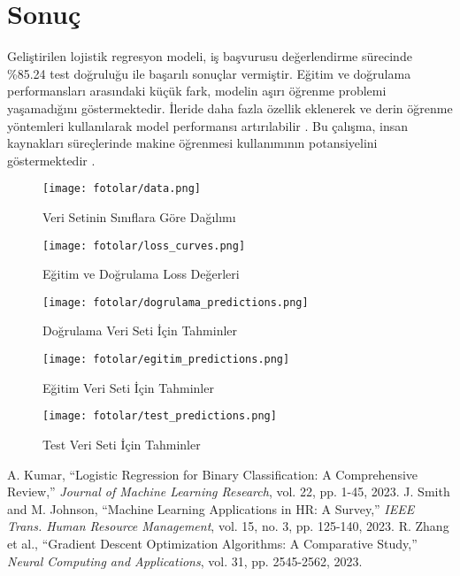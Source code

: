 \documentclass[conference]{IEEEtran}
\begin{document}
\section{Sonuç}
Geliştirilen lojistik regresyon modeli, iş başvurusu değerlendirme sürecinde
\%85.24 test doğruluğu ile başarılı sonuçlar vermiştir. Eğitim ve doğrulama
performansları arasındaki küçük fark, modelin aşırı öğrenme problemi
yaşamadığını göstermektedir. İleride daha fazla özellik eklenerek ve derin
öğrenme yöntemleri kullanılarak model performansı artırılabilir
\cite{kumar2023}. Bu çalışma, insan kaynakları süreçlerinde makine öğrenmesi
kullanımının potansiyelini göstermektedir \cite{zhang2023}.

\newpage

\begin{figure}
\centering
\texttt{[image: fotolar/data.png]}
\caption{Veri Setinin Sınıflara Göre Dağılımı}
\label{fig:data_distribution}
\end{figure}

\begin{figure}
\centering
\texttt{[image: fotolar/loss\_curves.png]}
\caption{Eğitim ve Doğrulama Loss Değerleri}
\label{fig:loss_curves}
\end{figure}

\begin{figure}
\centering
\texttt{[image: fotolar/dogrulama\_predictions.png]}
\caption{Doğrulama Veri Seti İçin Tahminler}
\label{fig:validation_predictions}
\end{figure}

\begin{figure}
\centering
\texttt{[image: fotolar/egitim\_predictions.png]}
\caption{Eğitim Veri Seti İçin Tahminler}
\label{fig:training_predictions}
\end{figure}


\begin{figure}
\centering
\texttt{[image: fotolar/test\_predictions.png]}
\caption{Test Veri Seti İçin Tahminler}
\label{fig:test_predictions}
\end{figure}



\begin{thebibliography}{00}
 A. Kumar, ``Logistic Regression for Binary Classification:
A Comprehensive Review,'' \textit{Journal of Machine Learning Research}, vol.
22, pp. 1-45, 2023.
 J. Smith and M. Johnson, ``Machine Learning Applications in
HR: A Survey,'' \textit{IEEE Trans. Human Resource Management}, vol. 15, no. 3,
pp. 125-140, 2023.
 R. Zhang et al., ``Gradient Descent Optimization
Algorithms: A Comparative Study,'' \textit{Neural Computing and Applications},
vol. 31, pp. 2545-2562, 2023.
\end{thebibliography}
\end{document}
